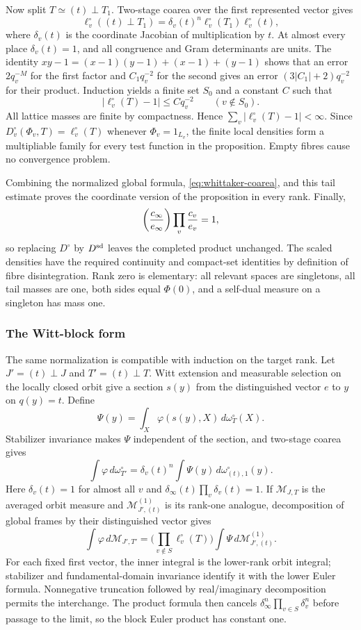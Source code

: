 Now split $T\simeq(t)\perp T_1$. Two-stage coarea over the first represented vector gives
\[
 \ell_v^\circ((t)\perp T_1)
 =\delta_v(t)^n\ell_v^\circ(T_1)\ell_v^\circ(t),
\]
where $\delta_v(t)$ is the coordinate Jacobian of multiplication by $t$. At almost every place $\delta_v(t)=1$, and all congruence and Gram determinants are units. The identity
$xy-1=(x-1)(y-1)+(x-1)+(y-1)$ shows that an error $2q_v^{-M}$ for the first factor and $C_1q_v^{-2}$ for the second gives an error $(3|C_1|+2)q_v^{-2}$ for their product. Induction yields a finite set $S_0$ and a constant $C$ such that
\[
 |\ell_v^\circ(T)-1|\le Cq_v^{-2}\qquad(v\notin S_0).
\]
All lattice masses are finite by compactness. Hence $\sum_v|\ell_v^\circ(T)-1|<\infty$. Since $D_v^\circ(\Phi_v,T)=\ell_v^\circ(T)$ whenever $\Phi_v=1_{L_v}$, the finite local densities form a multipliable family for every test function in the proposition. Empty fibres cause no convergence problem.

Combining the normalized global formula, \eqref{eq:whittaker-coarea}, and this tail estimate proves the coordinate version of the proposition in every rank. Finally,
\[
 \biggl({c_\infty\over e_\infty}\biggr)\prod_v{c_v\over e_v}=1,
\]
so replacing $D^\circ$ by $D^{\rm sd}$ leaves the completed product unchanged. The scaled densities have the required continuity and compact-set identities by definition of fibre disintegration. Rank zero is elementary: all relevant spaces are singletons, all tail masses are one, both sides equal $\Phi(0)$, and a self-dual measure on a singleton has mass one.

\subsubsection{The Witt-block form}

The same normalization is compatible with induction on the target rank. Let $J'=(t)\perp J$ and $T'=(t)\perp T$. Witt extension \cite[Theorem 42:17]{OMeara1973} and measurable selection on the locally closed orbit give a section $s(y)$ from the distinguished vector $e$ to $y$ on $q(y)=t$. Define
\[
 \Psi(y)=\int_X\varphi(s(y),X)\,d\omega_T^\circ(X).
\]
Stabilizer invariance makes $\Psi$ independent of the section, and two-stage coarea gives
\[
 \int\varphi\,d\omega_{T'}^\circ
 =\delta_v(t)^n\int\Psi(y)\,d\omega_{(t),1}^\circ(y).
\]
Here $\delta_v(t)=1$ for almost all $v$ and $\delta_\infty(t)\prod_v\delta_v(t)=1$. If $\mathcal M_{J,T}$ is the averaged orbit measure and $\mathcal M^{(1)}_{J',(t)}$ is its rank-one analogue, decomposition of global frames by their distinguished vector gives
\[
 \int\varphi\,d\mathcal M_{J',T'}
 =\Big(\prod_{v\notin S}\ell_v^\circ(T)\Big)
 \int\Psi\,d\mathcal M^{(1)}_{J',(t)}.
\]
For each fixed first vector, the inner integral is the lower-rank orbit integral; stabilizer and fundamental-domain invariance identify it with the lower Euler formula. Nonnegative truncation followed by real/imaginary decomposition permits the interchange. The product formula then cancels $\delta_\infty^n\prod_{v\in S}\delta_v^n$ before passage to the limit, so the block Euler product has constant one.

